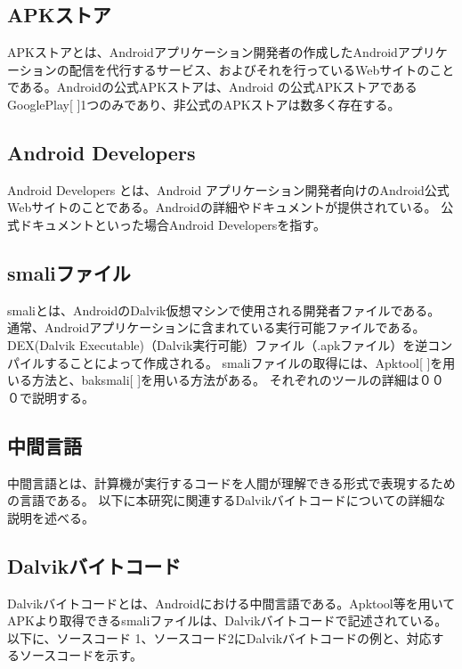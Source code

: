 \subsection{APKストア}
APKストアとは、Androidアプリケーション開発者の作成したAndroidアプリケーションの配信を代行するサービス、およびそれを行っているWebサイトのことである。Androidの公式APKストアは、Android の公式APKストアであるGooglePlay[ ]1つのみであり、非公式のAPKストアは数多く存在する。


\subsection{Android Developers}
Android Developers とは、Android アプリケーション開発者向けのAndroid公式Webサイトのことである。Androidの詳細やドキュメントが提供されている。
公式ドキュメントといった場合Android Developersを指す。


\subsection{smaliファイル}
smaliとは、AndroidのDalvik仮想マシンで使用される開発者ファイルである。
通常、Androidアプリケーションに含まれている実行可能ファイルである。
DEX(Dalvik Executable)（Dalvik実行可能）ファイル（.apkファイル）を逆コンパイルすることによって作成される。
smaliファイルの取得には、Apktool[ ]を用いる方法と、baksmali[ ]を用いる方法がある。
それぞれのツールの詳細は０００で説明する。


\subsection{中間言語}
中間言語とは、計算機が実行するコードを人間が理解できる形式で表現するための言語である。
以下に本研究に関連するDalvikバイトコードについての詳細な説明を述べる。


\subsection{Dalvikバイトコード}
Dalvikバイトコードとは、Androidにおける中間言語である。Apktool等を用いてAPKより取得できるsmaliファイルは、Dalvikバイトコードで記述されている。以下に、ソースコード 1、ソースコード2にDalvikバイトコードの例と、対応するソースコードを示す。

